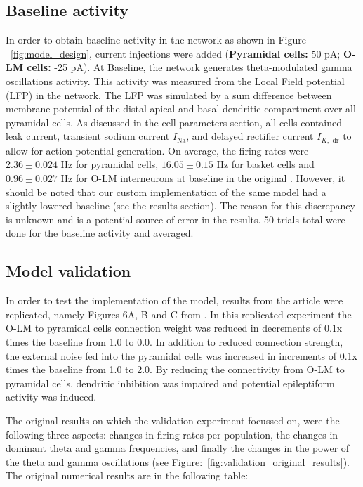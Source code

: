 \subsection{Baseline activity}
In order to obtain baseline activity in the network as shown in Figure
~\ref{fig:model_design}, current injections were added (\textbf{Pyramidal
    cells:} 50 pA\@; \textbf{O-LM cells:} -25 pA). At Baseline, the network
generates theta-modulated gamma oscillations activity. This activity was
measured from the Local Field potential (LFP) in the network. The LFP was
simulated by a sum difference between membrane potential of the distal apical
and basal dendritic compartment over all pyramidal cells. As discussed in the
cell parameters section, all cells contained leak current, transient sodium
current \(I_{\text{Na}}\), and delayed rectifier current \(I_{K, \text{-}
        \text{dr}}\) to allow for action potential generation. On average, the firing
rates were \(2.36 \pm 0.024\) Hz for pyramidal cells, \(16.05 \pm 0.15\) Hz for
basket cells and \(0.96 \pm 0.027\) Hz for O-LM interneurons at baseline in the
original \parencite{sanjayImpairedDendriticInhibition2015}. However, it should
be noted that our custom implementation of the same model had a slightly
lowered baseline (see the results section). The reason for this discrepancy is
unknown and is a potential source of error in the results. 50 trials total were
done for the baseline activity and averaged.

\subsection{Model validation}
In order to test the implementation of the model, results from the article were
replicated, namely Figures 6A, B and C from
\textcite{sanjayImpairedDendriticInhibition2015}. In this replicated experiment
the O-LM to pyramidal cells connection weight was reduced in decrements of 0.1x
times the baseline from 1.0 to 0.0. In addition to reduced connection strength,
the external noise fed into the pyramidal cells was increased in increments of
0.1x times the baseline from 1.0 to 2.0. By reducing the connectivity from O-LM
to pyramidal cells, dendritic inhibition was impaired and potential
epileptiform activity was induced.

The original results on which the validation experiment focussed on, were the
following three aspects: changes in firing rates per population, the changes in
dominant theta and gamma frequencies, and finally the changes in the power of
the theta and gamma oscillations (see
Figure:~\ref{fig:validation_original_results}). The original numerical results
are in the following table:

